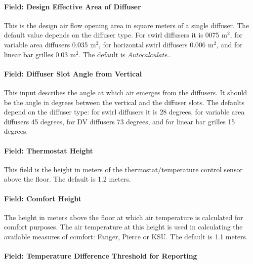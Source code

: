 \paragraph{Field: Design Effective Area of Diffuser}\label{field-design-effective-area-of-diffuser}

This is the design air flow opening area in square meters of a single diffuser. The default value depends on the diffuser type. For swirl diffusers it is 0075 m\(^{2}\), for variable area diffusers 0.035 m\(^{2}\), for horizontal swirl diffusers 0.006 m\(^{2}\), and for linear bar grilles 0.03 m\(^{2}\). The default is \emph{Autocalculate}..

\paragraph{Field: Diffuser Slot Angle from Vertical}\label{field-diffuser-slot-angle-from-vertical}

This input describes the angle at which air emerges from the diffusers. It should be the angle in degrees between the vertical and the diffuser slots. The defaults depend on the diffuser type: for swirl diffusers it is 28 degrees, for variable area diffusers 45 degrees, for DV diffusers 73 degrees, and for linear bar grilles 15 degrees.

\paragraph{Field: Thermostat Height}\label{field-thermostat-height-2}

This field is the height in meters of the thermostat/temperature control sensor above the floor. The default is 1.2 meters.

\paragraph{Field: Comfort Height}\label{field-comfort-height-1}

The height in meters above the floor at which air temperature is calculated for comfort purposes. The air temperature at this height is used in calculating the available measures of comfort: Fanger, Pierce or KSU. The default is 1.1 meters.

\paragraph{Field: Temperature Difference Threshold for Reporting}\label{field-temperature-difference-threshold-for-reporting-1}

